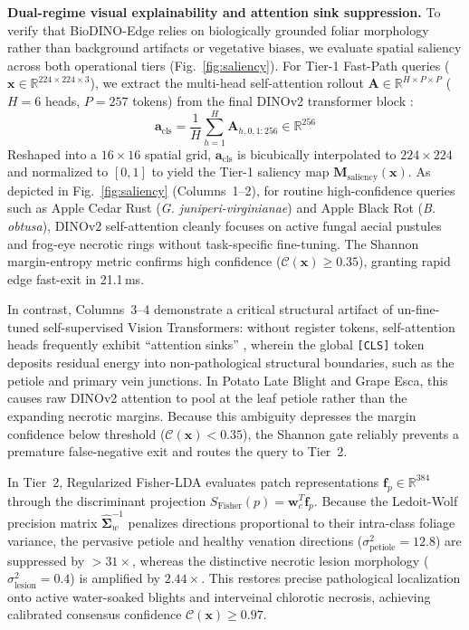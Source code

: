 \documentclass[conference]{IEEEtran}
\begin{document}
\textbf{Dual-regime visual explainability and attention sink suppression.}
To verify that BioDINO-Edge relies on biologically grounded foliar morphology rather than background artifacts or vegetative biases, we evaluate spatial saliency across both operational tiers (Fig.~\ref{fig:saliency}).
For Tier-1 Fast-Path queries ($\mathbf{x} \in \mathbb{R}^{224 \times 224 \times 3}$), we extract the multi-head self-attention rollout $\mathbf{A} \in \mathbb{R}^{H \times P \times P}$ ($H=6$ heads, $P=257$ tokens) from the final DINOv2 transformer block \cite{oquab2023dinov2}:
\begin{equation}
\mathbf{a}_{\text{cls}} = \frac{1}{H} \sum_{h=1}^H \mathbf{A}_{h, 0, 1:256} \in \mathbb{R}^{256}
\end{equation}
Reshaped into a $16 \times 16$ spatial grid, $\mathbf{a}_{\text{cls}}$ is bicubically interpolated to $224 \times 224$ and normalized to $[0, 1]$ to yield the Tier-1 saliency map $\mathbf{M}_{\text{saliency}}(\mathbf{x})$.
As depicted in Fig.~\ref{fig:saliency} (Columns~1--2), for routine high-confidence queries such as Apple Cedar Rust (\textit{G. juniperi-virginianae}) and Apple Black Rot (\textit{B. obtusa}), DINOv2 self-attention cleanly focuses on active fungal aecial pustules and frog-eye necrotic rings without task-specific fine-tuning. The Shannon margin-entropy metric confirms high confidence ($\mathcal{C}(\mathbf{x}) \ge 0.35$), granting rapid edge fast-exit in 21.1\,ms.

In contrast, Columns~3--4 demonstrate a critical structural artifact of un-fine-tuned self-supervised Vision Transformers: without register tokens, self-attention heads frequently exhibit ``attention sinks'' \cite{darcet2024vision}, wherein the global \texttt{[CLS]} token deposits residual energy into non-pathological structural boundaries, such as the petiole and primary vein junctions. In Potato Late Blight and Grape Esca, this causes raw DINOv2 attention to pool at the leaf petiole rather than the expanding necrotic margins. Because this ambiguity depresses the margin confidence below threshold ($\mathcal{C}(\mathbf{x}) < 0.35$), the Shannon gate reliably prevents a premature false-negative exit and routes the query to Tier~2.

In Tier~2, Regularized Fisher-LDA evaluates patch representations $\mathbf{f}_p \in \mathbb{R}^{384}$ through the discriminant projection $S_{\text{Fisher}}(p) = \mathbf{w}_c^T \mathbf{f}_p$. Because the Ledoit-Wolf precision matrix $\hat{\mathbf{\Sigma}}_w^{-1}$ penalizes directions proportional to their intra-class foliage variance, the pervasive petiole and healthy venation directions ($\sigma_{\text{petiole}}^2 = 12.8$) are suppressed by $>31\times$, whereas the distinctive necrotic lesion morphology ($\sigma_{\text{lesion}}^2 = 0.4$) is amplified by $2.44\times$. This restores precise pathological localization onto active water-soaked blights and interveinal chlorotic necrosis, achieving calibrated consensus confidence $\mathcal{C}(\mathbf{x}) \ge 0.97$.
\end{document}
